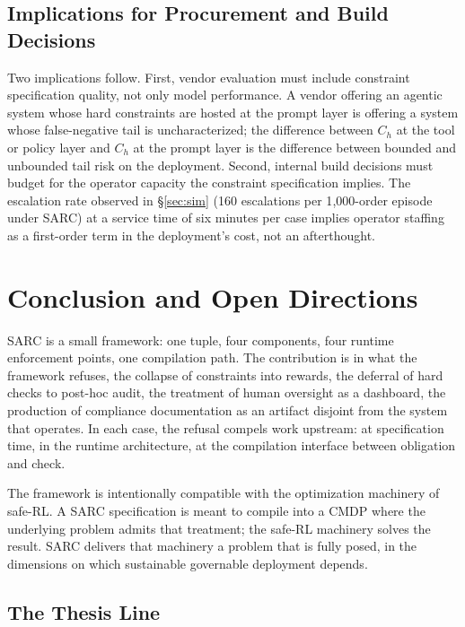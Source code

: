 \documentclass[11pt,a4paper]{article}
\theoremstyle{remark}
\begin{document}
\subsection{Implications for Procurement and Build Decisions}

Two implications follow. First, vendor evaluation must include constraint specification quality, not only model performance. A vendor offering an agentic system whose hard constraints are hosted at the prompt layer is offering a system whose false-negative tail is uncharacterized; the difference between $C_h$ at the tool or policy layer and $C_h$ at the prompt layer is the difference between bounded and unbounded tail risk on the deployment. Second, internal build decisions must budget for the operator capacity the constraint specification implies. The escalation rate observed in \S\ref{sec:sim} (160 escalations per 1{,}000-order episode under SARC) at a service time of six minutes per case implies operator staffing as a first-order term in the deployment's cost, not an afterthought.

\section{Conclusion and Open Directions}\label{sec:concl}

SARC is a small framework: one tuple, four components, four runtime enforcement points, one compilation path. The contribution is in what the framework refuses, the collapse of constraints into rewards, the deferral of hard checks to post-hoc audit, the treatment of human oversight as a dashboard, the production of compliance documentation as an artifact disjoint from the system that operates. In each case, the refusal compels work upstream: at specification time, in the runtime architecture, at the compilation interface between obligation and check.

The framework is intentionally compatible with the optimization machinery of safe-RL. A SARC specification is meant to compile into a CMDP where the underlying problem admits that treatment; the safe-RL machinery solves the result. SARC delivers that machinery a problem that is fully posed, in the dimensions on which sustainable governable deployment depends.

\subsection{The Thesis Line}
\end{document}
